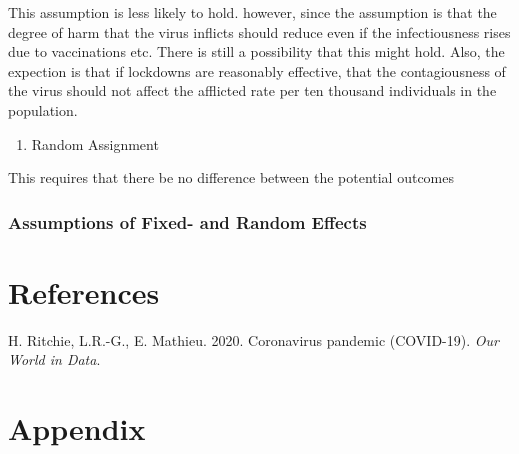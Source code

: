 \documentclass[11pt,preprint, authoryear]{elsarticle}
\numberwithin{equation}{section}
\numberwithin{figure}{section}
\numberwithin{table}{section}
\def\tightlist{} %
\newlength{\cslhangindent}
\newenvironment{CSLReferences}%
  {\setlength{\parindent}{0pt}%
  \everypar{\setlength{\hangindent}{\cslhangindent}}\ignorespaces}%
  {\par}
\begin{document}
This assumption is less likely to hold. however, since the assumption is
that the degree of harm that the virus inflicts should reduce even if
the infectiousness rises due to vaccinations etc. There is still a
possibility that this might hold. Also, the expection is that if
lockdowns are reasonably effective, that the contagiousness of the virus
should not affect the afflicted rate per ten thousand individuals in the
population.

\begin{enumerate}
\def\labelenumi{\arabic{enumi}.}
\setcounter{enumi}{1}
\tightlist
\item
  Random Assignment
\end{enumerate}

This requires that there be no difference between the potential outcomes

\hypertarget{assumptions-of-fixed--and-random-effects}{%
\subsubsection{Assumptions of Fixed- and Random
Effects}\label{assumptions-of-fixed--and-random-effects}}

\hypertarget{references}{%
\section{References}\label{references}}

\hypertarget{refs}{}
\begin{CSLReferences}{1}{0}
\leavevmode{}%
H. Ritchie, L.R.-G., E. Mathieu. 2020. Coronavirus pandemic (COVID-19).
\emph{Our World in Data}.

\end{CSLReferences}

\hypertarget{appendix}{%
\section{Appendix}\label{appendix}}
\end{document}
